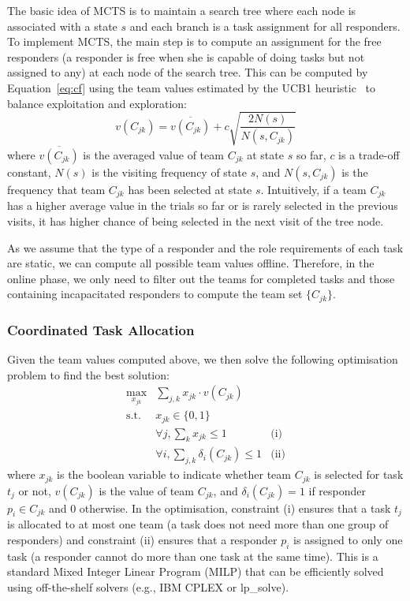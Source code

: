The basic idea of MCTS is to maintain a search tree where each node
is associated with a state $s$ and each branch is a task assignment
for all responders. To implement MCTS, the main step is to compute
an assignment for the free responders (a responder is free when she
is capable of doing tasks but not assigned to any) at each
node of the search tree. This can be computed by
Equation~\ref{eq:cf} using the team values estimated by the UCB1
heuristic~\cite{auer2002finite} to balance exploitation and
exploration:
\begin{equation}
  v(C_{jk}) = \overline{v(C_{jk})} + c\sqrt{\frac{2N(s)}{N(s, C_{jk})}}
\end{equation}
where $\overline{v(C_{jk})}$ is the averaged value of team $C_{jk}$
at state $s$ so far, $c$ is a trade-off constant, $N(s)$ is the
visiting frequency of state $s$, and $N(s, C_{jk})$ is the
frequency that team $C_{jk}$ has been selected at state $s$.
Intuitively, if a team $C_{jk}$ has  a higher average value in the
trials so far or is rarely selected in the previous visits, it has
higher chance of being selected in the next visit of the tree node.

As we assume that the type of a responder and the role requirements
of each task are static, we can compute all possible team values
offline. Therefore, in the online phase, we only need to filter out
the teams for completed tasks and those containing
incapacitated responders to compute the team set $\{ C_{jk} \}$.

\subsubsection{Coordinated Task Allocation}
\noindent Given the team values computed above, we then solve the
following optimisation problem to find the best solution:
\begin{equation}
  \begin{array}{lll}
    \max\limits_{x_{jk}} & \sum_{j, k} x_{jk} \cdot v(C_{jk}) & \\[2pt]
    \mbox{s.t.} & x_{jk} \in \{0, 1\} & \\[2pt]
    & \forall j, \sum_{k} x_{jk} \leq 1 & \mbox{(i)} \\[2pt]
    & \forall i, \sum_{j, k} \delta_i(C_{jk}) \leq 1 & \mbox{(ii)}
  \end{array}
  \label{eq:cf}
\end{equation}
where $x_{jk}$ is the boolean variable to indicate whether team
$C_{jk}$ is selected for task $t_j$ or not, $v(C_{jk})$ is the value of team $C_{jk}$, and $\delta_i(C_{jk}) =
1$ if responder $p_i\in C_{jk}$ and 0 otherwise. In the
optimisation, constraint (i) ensures that a task $t_j$ is allocated
to at most one team (a task does not need more than one group of
responders) and constraint (ii) ensures that a responder $p_i$ is
assigned to only one task (a responder cannot do more than one task
at the same time). This is a standard Mixed Integer Linear Program
(MILP) that can be efficiently solved  using off-the-shelf solvers (e.g., IBM CPLEX or lp\_solve).

